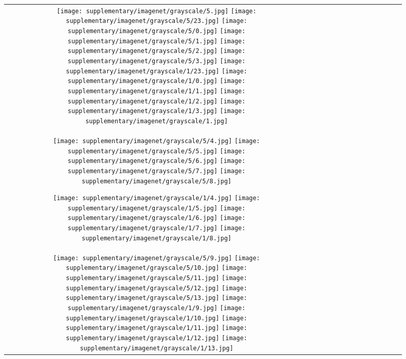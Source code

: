 \begin{figure*}[tb!]
    \centering
    \setlength{\tabcolsep}{0.5pt}
    {\small
    \renewcommand{\arraystretch}{0.5} 
    \begin{tabular}{c c c c c c c c c c c c c c }
    \captionsetup{type=figure, font=scriptsize}
  \texttt{[image: supplementary/imagenet/grayscale/5.jpg]}
  \texttt{[image: supplementary/imagenet/grayscale/5/23.jpg]}
  \texttt{[image: supplementary/imagenet/grayscale/5/0.jpg]}
  \texttt{[image: supplementary/imagenet/grayscale/5/1.jpg]}
  \texttt{[image: supplementary/imagenet/grayscale/5/2.jpg]}
  \texttt{[image: supplementary/imagenet/grayscale/5/3.jpg]}
    \hspace{5mm}
  \texttt{[image: supplementary/imagenet/grayscale/1/23.jpg]}
  \texttt{[image: supplementary/imagenet/grayscale/1/0.jpg]}
  \texttt{[image: supplementary/imagenet/grayscale/1/1.jpg]}
  \texttt{[image: supplementary/imagenet/grayscale/1/2.jpg]}
  \texttt{[image: supplementary/imagenet/grayscale/1/3.jpg]}
  \texttt{[image: supplementary/imagenet/grayscale/1.jpg]}

 \tabularnewline
  \texttt{[image: supplementary/imagenet/grayscale/5/4.jpg]}
  \texttt{[image: supplementary/imagenet/grayscale/5/5.jpg]}
  \texttt{[image: supplementary/imagenet/grayscale/5/6.jpg]}
  \texttt{[image: supplementary/imagenet/grayscale/5/7.jpg]}
  \texttt{[image: supplementary/imagenet/grayscale/5/8.jpg]}
    \hspace{5mm}
    
  \texttt{[image: supplementary/imagenet/grayscale/1/4.jpg]}
  \texttt{[image: supplementary/imagenet/grayscale/1/5.jpg]}
  \texttt{[image: supplementary/imagenet/grayscale/1/6.jpg]}
  \texttt{[image: supplementary/imagenet/grayscale/1/7.jpg]}
  \texttt{[image: supplementary/imagenet/grayscale/1/8.jpg]}
\tabularnewline
  \texttt{[image: supplementary/imagenet/grayscale/5/9.jpg]}
  \texttt{[image: supplementary/imagenet/grayscale/5/10.jpg]}
  \texttt{[image: supplementary/imagenet/grayscale/5/11.jpg]}
  \texttt{[image: supplementary/imagenet/grayscale/5/12.jpg]}
  \texttt{[image: supplementary/imagenet/grayscale/5/13.jpg]}
    \hspace{5mm}
  \texttt{[image: supplementary/imagenet/grayscale/1/9.jpg]}
  \texttt{[image: supplementary/imagenet/grayscale/1/10.jpg]}
  \texttt{[image: supplementary/imagenet/grayscale/1/11.jpg]}
  \texttt{[image: supplementary/imagenet/grayscale/1/12.jpg]}
  \texttt{[image: supplementary/imagenet/grayscale/1/13.jpg]}


\end{tabular}}
\end{figure*}
